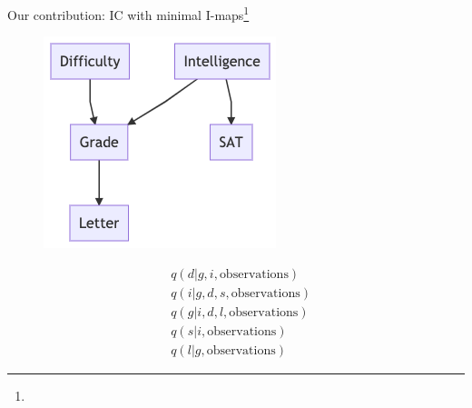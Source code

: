 \begin{frame}[fragile]{Our contribution: IC with minimal I-maps\footnote{}}
    \begin{minipage}{0.4\linewidth}
    \begin{figure}
        \centering
        \includegraphics[width=\linewidth]{Figures/lic/student-network.png}
    \end{figure}
\end{minipage}
\begin{minipage}{0.5\linewidth}
\begin{align*}
    & q(d | g, i, \text{observations}) \\
    & q(i | g, d, s, \text{observations}) \\
    & q(g | i, d, l, \text{observations}) \\
    & q(s | i, \text{observations}) \\
    & q(l | g, \text{observations})
\end{align*}
\end{minipage}
\end{frame}


